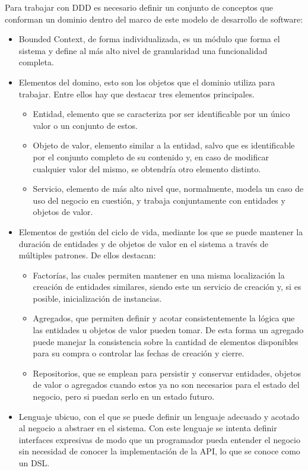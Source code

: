 \documentclass{article}
\begin{document}
\begin{multicols}{2}
Para trabajar con DDD es necesario definir un conjunto de conceptos que conforman un dominio dentro del marco de este modelo de desarrollo de software:
\begin{itemize}
    \item Bounded Context, de forma individualizada, es un módulo que forma el sistema y define al más alto nivel de granularidad una funcionalidad completa.
    \item Elementos del domino, esto son los objetos que el dominio utiliza para trabajar. Entre ellos hay que destacar tres elementos principales.
    \begin{itemize}
        \item Entidad, elemento que se caracteriza por ser identificable por un único valor o un conjunto de estos.
        \item Objeto de valor, elemento similar a la entidad, salvo que es identificable por el conjunto completo de su contenido y, en caso de modificar cualquier valor del mismo, se obtendría otro elemento distinto.
        \item Servicio, elemento de más alto nivel que, normalmente, modela un caso de uso del negocio en cuestión, y trabaja conjuntamente con entidades y objetos de valor.
    \end{itemize}
    \item Elementos de gestión del ciclo de vida, mediante los que se puede mantener la duración de entidades y de objetos de valor en el sistema a través de múltiples patrones. De ellos destacan:
    \begin{itemize}
        \item Factorías, las cuales permiten mantener en una misma localización la creación de entidades similares, siendo este un servicio de creación y, si es posible, inicialización de instancias.
        \item Agregados, que permiten definir y acotar consistentemente la lógica que las entidades u objetos de valor pueden tomar. De esta forma un agregado puede manejar la consistencia sobre la cantidad de elementos disponibles para su compra o controlar las fechas de creación y cierre.
        \item Repositorios, que se emplean para persistir y conservar entidades, objetos de valor o agregados cuando estos ya no son necesarios para el estado del negocio, pero si puedan serlo en un estado futuro.
    \end{itemize}
    \item Lenguaje ubicuo, con el que se puede definir un lenguaje adecuado y acotado al negocio a abstraer en el sistema. Con este lenguaje se intenta definir interfaces expresivas de modo que un programador pueda entender el negocio sin necesidad de conocer la implementación de la API, lo que se conoce como un DSL.
\end{itemize}


\end{multicols}
\end{document}
